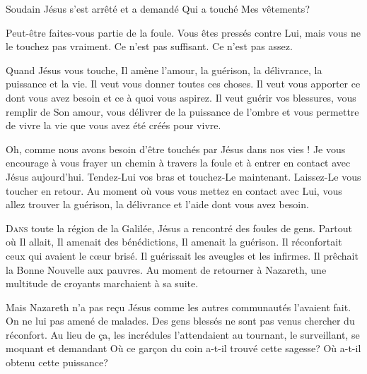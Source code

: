 Soudain Jésus s'est arrêté et a demandé\frcolon{} 
 \Og Qui a touché Mes vêtements? \Fg{}


Peut-être faites-vous partie de la foule. Vous êtes pressés contre Lui,
 mais vous ne le touchez pas vraiment. Ce n'est pas suffisant.
 Ce n'est pas assez.

Quand Jésus vous touche, Il amène l'amour, la guérison, la délivrance,
 la puissance et la vie. Il veut vous donner toutes ces choses.
 Il veut vous  apporter ce dont vous avez besoin
 et ce à quoi vous aspirez. Il veut guérir vos blessures,
 vous remplir de Son amour, vous délivrer de la puissance de l'ombre
 et vous permettre de vivre la vie que vous avez été créés pour vivre.

Oh, comme nous avons besoin d'être touchés par Jésus dans nos vies !
 Je vous encourage à vous frayer un chemin à travers la foule
 et à entrer en contact avec Jésus aujourd'hui.
 Tendez-Lui  vos bras et touchez-Le 
 maintenant. Laissez-Le   vous toucher en retour.
 Au moment où vous vous mettez en contact avec Lui,
 vous allez trouver la guérison, la délivrance et l'aide dont vous avez besoin.

\dvrule






\lettrine{D}{ans} toute la région de la Galilée,
 Jésus a rencontré des foules de gens. Partout où Il allait,
 Il amenait des bénédictions, Il amenait la guérison.
 Il réconfortait ceux qui avaient le c\oe{}ur brisé.
 Il guérissait les aveugles et les infirmes.
 Il prêchait la Bonne Nouvelle aux pauvres.
 Au moment de retourner à Nazareth, une multitude de croyants
 marchaient à sa suite.

Mais Nazareth n'a pas re\c{c}u Jésus comme les autres communautés
 l'avaient fait. On ne lui pas amené de malades.
 Des gens blessés ne sont pas venus chercher du réconfort.
 Au lieu de \c{c}a, les incrédules l'attendaient au tournant,
 le surveillant, se moquant et demandant\frcolon{}
 \Og Où ce gar\c{c}on du coin a-t-il trouvé cette sagesse? \Fg{}
 \Og Où a-t-il obtenu cette puissance? \Fg{}

